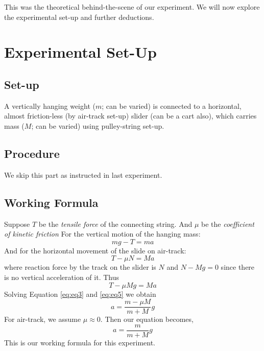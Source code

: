 \documentclass[11pt, a4paper, abstract=true]{scrartcl}
\begin{document}
This was the theoretical behind-the-scene of our experiment. We will now explore the experimental set-up and further deductions.

\section{Experimental Set-Up}
\subsection{Set-up}
A vertically hanging weight (\(m\); can be varied) is connected to a horizontal, almost friction-less (by air-track set-up) slider (can be a cart also), which carries mass (\(M\); can be varied) using pulley-string set-up.
\subsection{Procedure}
We skip this part as instructed in last experiment.
\subsection{Working Formula}
Suppose \(T\) be the \emph{tensile force} of the connecting string. And \(\mu\) be the \emph{coefficient of kinetic friction} For the vertical motion of the hanging mass:
\begin{equation}
    mg - T = ma
    \label{eq:eq3} 
\end{equation}
And for the horizontal movement of the slide on air-track:
\begin{equation}
    T - \mu N = Ma
    \label{eq:eq4}
\end{equation}
where reaction force by the track on the slider is \(N\) and \(N - Mg = 0\) since there is no vertical acceleration of it. Thus
\begin{equation}
    T - \mu Mg = Ma
    \label{eq:eq5} 
\end{equation}
Solving Equation \ref{eq:eq3} and \ref{eq:eq5} we obtain \begin{equation}
    a = \frac{m - \mu M}{m + M} g
\end{equation}
For air-track, we assume \(\mu \approx 0\). Then our equation becomes,
\begin{equation}
    a = \frac{m}{m + M} g
\end{equation}
This is our working formula for this experiment.
\end{document}
